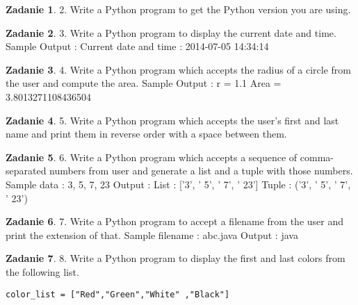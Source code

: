 \documentclass[11pt]{article}
\theoremstyle{definition}
\newtheorem{zadanie}{Zadanie}
\begin{document}
\begin{zadanie}


2. Write a Python program to get the Python version you are using. 

\end{zadanie}

\begin{zadanie}


3. Write a Python program to display the current date and time.
Sample Output :
Current date and time :
2014-07-05 14:34:14

\end{zadanie}

\begin{zadanie}


4. Write a Python program which accepts the radius of a circle from the user and compute the area. 
Sample Output :
r = 1.1
Area = 3.8013271108436504

\end{zadanie}

\begin{zadanie}


5. Write a Python program which accepts the user's first and last name and print them in reverse order with a space between them. 

\end{zadanie}

\begin{zadanie}


6. Write a Python program which accepts a sequence of comma-separated numbers from user and generate a list and a tuple with those numbers. 
Sample data : 3, 5, 7, 23
Output :
List : ['3', ' 5', ' 7', ' 23']
Tuple : ('3', ' 5', ' 7', ' 23')

\end{zadanie}

\begin{zadanie}


7. Write a Python program to accept a filename from the user and print the extension of that. 
Sample filename : abc.java
Output : java

\end{zadanie}

\begin{zadanie}


8. Write a Python program to display the first and last colors from the following list. 
\begin{verbatim}
color_list = ["Red","Green","White" ,"Black"]
\end{verbatim}
\end{zadanie}
\end{document}
